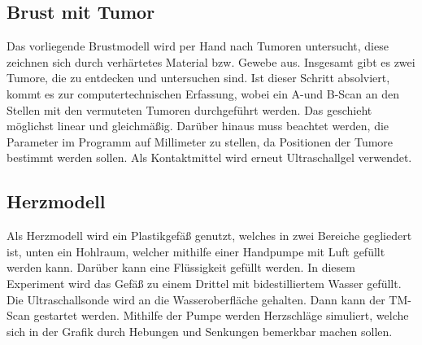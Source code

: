\subsection{Brust mit Tumor}
Das vorliegende Brustmodell wird per Hand nach Tumoren untersucht, diese 
zeichnen sich durch verhärtetes Material bzw. Gewebe aus. Insgesamt gibt es 
zwei Tumore, die zu entdecken und untersuchen sind. Ist dieser Schritt 
absolviert, kommt es zur computertechnischen Erfassung, wobei ein A-und B-Scan 
an den Stellen mit den vermuteten Tumoren durchgeführt werden. Das geschieht 
möglichst linear und gleichmäßig. Darüber hinaus muss beachtet werden, die
Parameter im Programm auf Millimeter zu stellen, da Positionen der Tumore
bestimmt werden sollen. Als Kontaktmittel wird erneut Ultraschallgel verwendet.

\subsection{Herzmodell}
Als Herzmodell wird ein Plastikgefäß genutzt, welches in zwei Bereiche gegliedert 
ist, unten ein Hohlraum, welcher mithilfe einer Handpumpe mit Luft gefüllt 
werden kann. Darüber kann eine Flüssigkeit gefüllt werden. In diesem Experiment 
wird das Gefäß zu einem Drittel mit bidestilliertem Wasser gefüllt. Die 
Ultraschallsonde wird an die Wasseroberfläche gehalten. Dann kann der TM-Scan 
gestartet werden. Mithilfe der Pumpe werden Herzschläge simuliert, welche sich 
in der Grafik durch Hebungen und Senkungen bemerkbar machen sollen.